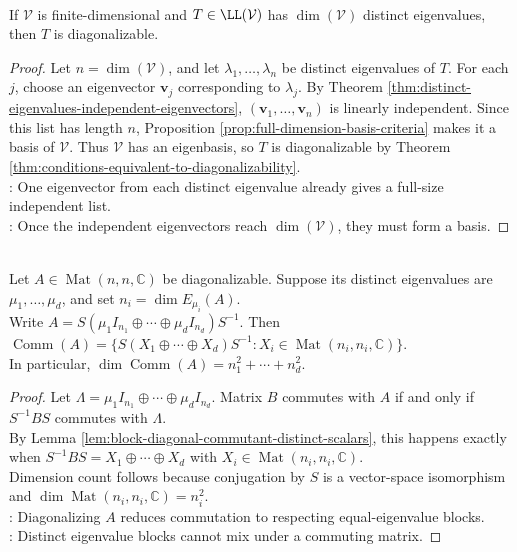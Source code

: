 \begin{corollary} \label{cor:enough-eigenvalues-implies-diagonalizable} \\
If $\mathcal{V}$ is finite-dimensional and $T\in\LL(\mathcal{V})$ has $\dim(\mathcal{V})$ distinct eigenvalues, then $T$ is diagonalizable.
\begin{proof}
Let $n=\dim(\mathcal{V})$, and let $\lambda_1,\ldots,\lambda_n$ be distinct eigenvalues of $T$. For each $j$, choose an eigenvector $\mathbf{v}_j$ corresponding to $\lambda_j$. By Theorem \ref{thm:distinct-eigenvalues-independent-eigenvectors}, $(\mathbf{v}_1,\ldots,\mathbf{v}_n)$ is linearly independent. Since this list has length $n$, Proposition \ref{prop:full-dimension-basis-criteria} makes it a basis of $\mathcal{V}$. Thus $\mathcal{V}$ has an eigenbasis, so $T$ is diagonalizable by Theorem \ref{thm:conditions-equivalent-to-diagonalizability}.\\
: One eigenvector from each distinct eigenvalue already gives a full-size independent list.\\
: Once the independent eigenvectors reach $\dim(\mathcal{V})$, they must form a basis.
\end{proof}
\end{corollary}

\begin{theorem} \label{thm:commutant-of-diagonalizable-matrix} \\
Let $A\in\operatorname{Mat}(n,n,\mathbb{C})$ be diagonalizable. Suppose its distinct eigenvalues are $\mu_1,\ldots,\mu_d$, and set $n_i=\dim E_{\mu_i}(A)$.\\
Write $A=S(\mu_1I_{n_1}\oplus\cdots\oplus\mu_dI_{n_d})S^{-1}$. Then $\operatorname{Comm}(A)=\{S(X_1\oplus\cdots\oplus X_d)S^{-1}:X_i\in\operatorname{Mat}(n_i,n_i,\mathbb{C})\}$.\\
In particular, $\dim\operatorname{Comm}(A)=n_1^2+\cdots+n_d^2$.
\begin{proof}
Let $\Lambda=\mu_1I_{n_1}\oplus\cdots\oplus\mu_dI_{n_d}$. Matrix $B$ commutes with $A$ if and only if $S^{-1}BS$ commutes with $\Lambda$.\\
By Lemma \ref{lem:block-diagonal-commutant-distinct-scalars}, this happens exactly when $S^{-1}BS=X_1\oplus\cdots\oplus X_d$ with $X_i\in\operatorname{Mat}(n_i,n_i,\mathbb{C})$.\\
Dimension count follows because conjugation by $S$ is a vector-space isomorphism and $\dim\operatorname{Mat}(n_i,n_i,\mathbb{C})=n_i^2$.\\
: Diagonalizing $A$ reduces commutation to respecting equal-eigenvalue blocks.\\
: Distinct eigenvalue blocks cannot mix under a commuting matrix.
\end{proof}
\end{theorem}

